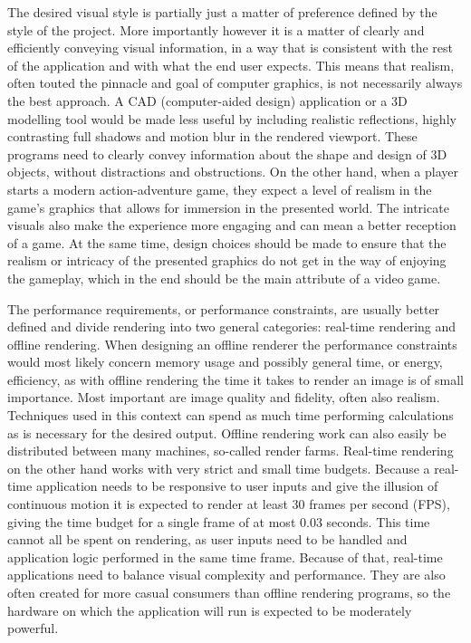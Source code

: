 The desired visual style is partially just a matter of preference defined by the style of the project. More importantly however it is a matter of clearly and efficiently conveying visual information, in a way that is consistent with the rest of the application and with what the end user expects. This means that realism, often touted the pinnacle and goal of computer graphics, is not necessarily always the best approach. A CAD (computer-aided design) application or a 3D modelling tool would be made less useful by including realistic reflections, highly contrasting full shadows and motion blur in the rendered viewport. These programs need to clearly convey information about the shape and design of 3D objects, without distractions and obstructions. On the other hand, when a player starts a modern action-adventure game, they expect a level of realism in the game's graphics that allows for immersion in the presented world. The intricate visuals also make the experience more engaging and can mean a better reception of a game. At the same time, design choices should be made to ensure that the realism or intricacy of the presented graphics do not get in the way of enjoying the gameplay, which in the end should be the main attribute of a video game.

The performance requirements, or performance constraints, are usually better defined and divide rendering into two general categories: real-time rendering and offline rendering. When designing an offline renderer the performance constraints would most likely concern memory usage and possibly general time, or energy, efficiency, as with offline rendering the time it takes to render an image is of small importance. Most important are image quality and fidelity, often also realism. Techniques used in this context can spend as much time performing calculations as is necessary for the desired output. Offline rendering work can also easily be distributed between many machines, so-called render farms. Real-time rendering on the other hand works with very strict and small time budgets. Because a real-time application needs to be responsive to user inputs and give the illusion of continuous motion it is expected to render at least 30 frames per second (FPS), giving the time budget for a single frame of at most 0.03 seconds. This time cannot all be spent on rendering, as user inputs need to be handled and application logic performed in the same time frame. Because of that, real-time applications need to balance visual complexity and performance. They are also often created for more casual consumers than offline rendering programs, so the hardware on which the application will run is expected to be moderately powerful.

